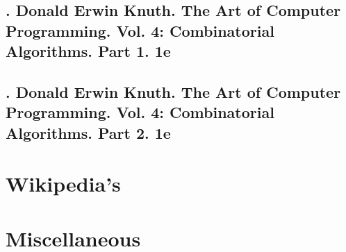 \documentclass{article}
\begin{document}

\subsection{\cite{Knuth2011}. {\sc Donald Erwin Knuth}. The Art of Computer Programming. Vol. 4: Combinatorial Algorithms. Part 1. 1e}


\subsection{\cite{Knuth2011}. {\sc Donald Erwin Knuth}. The Art of Computer Programming. Vol. 4: Combinatorial Algorithms. Part 2. 1e}


\section{Wikipedia's}


\section{Miscellaneous}


\printbibliography[heading=bibintoc]
	
\end{document}

